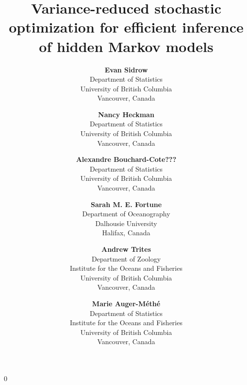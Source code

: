 \documentclass[12pt]{article}
\newcommand{\blind}{0}
\begin{document}
%

\def\spacingset#1{\renewcommand{\baselinestretch}%
{#1}\small\normalsize} \spacingset{1}


\blind
{
    \title{Variance-reduced stochastic optimization for efficient inference of hidden Markov models}

    \author{
      \textbf{Evan Sidrow} \\
      Department of Statistics \\
      University of British Columbia\\
      Vancouver, Canada \\
      \and
      \textbf{Nancy Heckman} \\
      Department of Statistics \\
      University of British Columbia \\
      Vancouver, Canada \\
      \and
      \textbf{Alexandre Bouchard-Cote???} \\
      Department of Statistics \\
      University of British Columbia \\
      Vancouver, Canada \\
      \and
      \textbf{Sarah M. E. Fortune} \\
      Department of Oceanography \\
      Dalhousie University \\
      Halifax, Canada \\
      \and
      \textbf{Andrew Trites} \\
      Department of Zoology \\
      Institute for the Oceans and Fisheries \\
      University of British Columbia \\
      Vancouver, Canada \\
      \and
      \textbf{Marie Auger-M\'eth\'e} \\
      Department of Statistics \\
      Institute for the Oceans and Fisheries \\
      University of British Columbia \\
      Vancouver, Canada \\
    }
    \maketitle
} \fi
\end{document}

